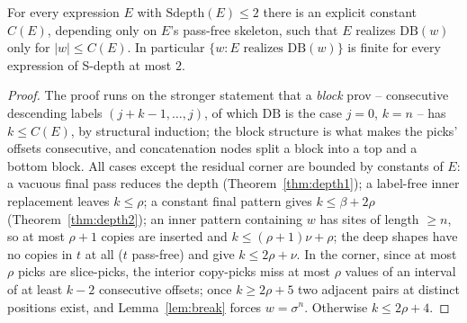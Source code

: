 \begin{theorem}
    \label{thm:depth2finite}
    For every expression $E$ with $\mathrm{Sdepth}(E) \leq 2$ there is
    an explicit constant $C(E)$, depending only on $E$'s pass-free
    skeleton, such that $E$ realizes $\mathrm{DB}(w)$ only for
    $|w| \leq C(E)$.  In particular $\{w : E \text{ realizes }
    \mathrm{DB}(w)\}$ is finite for every expression of S-depth at
    most $2$.
\end{theorem}

\begin{proof}
    The proof runs on the stronger statement that a \emph{block} prov
    -- consecutive descending labels $(j+k-1, \ldots, j)$, of which
    $\mathrm{DB}$ is the case $j = 0$, $k = n$ -- has $k \leq C(E)$,
    by structural induction; the block structure is what makes the
    picks' offsets consecutive, and concatenation nodes split a block
    into a top and a bottom block.  All cases except the residual
    corner are bounded by constants of $E$: a vacuous final pass
    reduces the depth (Theorem~\ref{thm:depth1}); a label-free inner
    replacement leaves $k \leq \rho$; a constant final pattern gives
    $k \leq \beta + 2\rho$ (Theorem~\ref{thm:depth2}); an inner
    pattern containing $w$ has sites of length $\geq n$, so at most
    $\rho + 1$ copies are inserted and $k \leq (\rho+1)\nu + \rho$;
    the deep shapes have no copies in $t$ at all ($t$ pass-free) and
    give $k \leq 2\rho + \nu$.  In the corner, since at most $\rho$
    picks are slice-picks, the interior copy-picks miss at most
    $\rho$ values of an interval of at least $k - 2$ consecutive
    offsets; once $k \geq 2\rho + 5$ two adjacent pairs at distinct
    positions exist, and Lemma~\ref{lem:break} forces $w =
    \sigma^{n}$.  Otherwise $k \leq 2\rho + 4$.


\end{proof}
